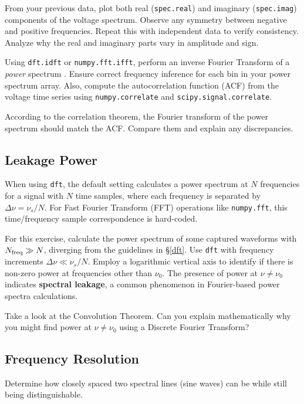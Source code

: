 \documentclass[11pt,preprint]{aastex}
\begin{document}
From your previous data, plot both real ({\tt spec.real}) and imaginary ({\tt spec.imag}) components of the voltage spectrum. Observe any symmetry between negative and positive frequencies. Repeat this with independent data to verify consistency. Analyze why the real and imaginary parts vary in amplitude and sign.

Using {\tt dft.idft} or {\tt numpy.fft.ifft}, perform an inverse Fourier Transform of a {\it power} spectrum .
Ensure correct frequency inference for each bin in your power spectrum array. Also, compute the autocorrelation function (ACF) from the voltage time series using {\tt numpy.correlate} and {\tt scipy.signal.correlate}. 

According to the correlation theorem, the Fourier transform of the power spectrum should match the ACF. Compare them and explain any discrepancies.


\subsection{Leakage Power} \label{subleakage}

\noindent
When using {\tt dft}, the default setting calculates a power spectrum at $N$ frequencies for a signal with $N$ time samples, where each frequency is separated by $\Delta\nu = \nu_s/N$. 
For Fast Fourier Transform (FFT) operations like {\tt numpy.fft}, this time/frequency sample correspondence is hard-coded.

For this exercise, calculate the power spectrum of some captured waveforms with $N_{\rm freq}\gg N$, diverging from the guidelines in \S \ref{dft}.
Use {\tt dft} with frequency increments $\Delta \nu \ll \nu_s/N$. Employ a logarithmic vertical axis to identify if there is non-zero power at frequencies other than $\nu_0$. The presence of power at $\nu\ne\nu_0$ indicates \textbf{spectral leakage}, a common phenomenon in Fourier-based power spectra calculations. 

Take a look at the Convolution Theorem. Can you explain mathematically why you might find power at $\nu\ne\nu_0$ using a Discrete Fourier Transform?


\subsection{Frequency Resolution} \label{freqres}

\noindent
Determine how closely spaced two spectral lines (sine waves) can be while still being distinguishable.
\end{document}
